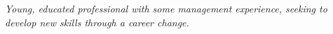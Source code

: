 
\vspace{-1.3em} %

\begin{multicols}{2}  %
\noindent \textit{Young, educated professional with some management experience, seeking to develop new skills through a career change.}\\\\












\end{multicols}

